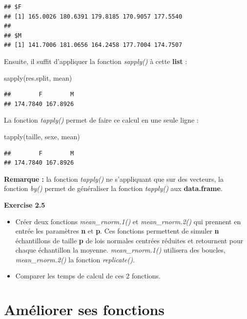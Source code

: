 \documentclass[
]{book}
\newenvironment{Shaded}{\begin{snugshade}}{\end{snugshade}}
\newcommand{\FunctionTok}[1]{\textcolor[rgb]{0.00,0.00,0.00}{#1}}
\newcommand{\NormalTok}[1]{#1}
\theoremstyle{definition}
\theoremstyle{definition}
\theoremstyle{definition}
\theoremstyle{definition}
\theoremstyle{remark}
\begin{document}
\begin{verbatim}
## $F
## [1] 165.0026 180.6391 179.8185 170.9057 177.5540
## 
## $M
## [1] 141.7006 181.0656 164.2458 177.7004 174.7507
\end{verbatim}

Ensuite, il suffit d'appliquer la fonction \emph{sapply()} à cette \textbf{list} :

\begin{Shaded}
\begin{Highlighting}[]
\FunctionTok{sapply}\NormalTok{(res.split, mean)}
\end{Highlighting}
\end{Shaded}

\begin{verbatim}
##        F        M 
## 174.7840 167.8926
\end{verbatim}

La fonction \emph{tapply()} permet de faire ce calcul en une seule ligne :

\begin{Shaded}
\begin{Highlighting}[]
\FunctionTok{tapply}\NormalTok{(taille, sexe, mean)}
\end{Highlighting}
\end{Shaded}

\begin{verbatim}
##        F        M 
## 174.7840 167.8926
\end{verbatim}

\textbf{Remarque :} la fonction \emph{tapply()} ne s'appliquant que sur des vecteurs, la fonction \emph{by()} permet de généraliser la fonction \emph{tapply()} aux \textbf{data.frame}.

\textbf{Exercise 2.5}

\begin{itemize}
\item
  Créer deux fonctions \emph{mean\_rnorm.1()} et \emph{mean\_rnorm.2()} qui prennent en entrée les paramètres \textbf{n} et \textbf{p}. Ces fonctions permettent de simuler \textbf{n} échantillons de taille \textbf{p} de lois normales centrées réduites et retournent pour chaque échantillon la moyenne. \emph{mean\_rnorm.1()} utilisera des boucles, \emph{mean\_rnorm.2()} la fonction \emph{replicate()}.
\item
  Comparer les temps de calcul de ces 2 fonctions.
\end{itemize}

\hypertarget{amuxe9liorer-ses-fonctions}{%
\section{Améliorer ses fonctions}\label{amuxe9liorer-ses-fonctions}}
\end{document}
